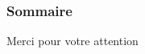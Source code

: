 \documentclass[xcolor=dvipsnames]{beamer} %
\begin{document}



\begin{frame}
  \scriptsize
  \frametitle{Sommaire}
  \tableofcontents
\end{frame}










\begin{frame}
  \large
  \centering
  Merci pour votre attention
\end{frame}

\appendix   %
\vspace*{1mm}
\printbibliography
\end{document}
